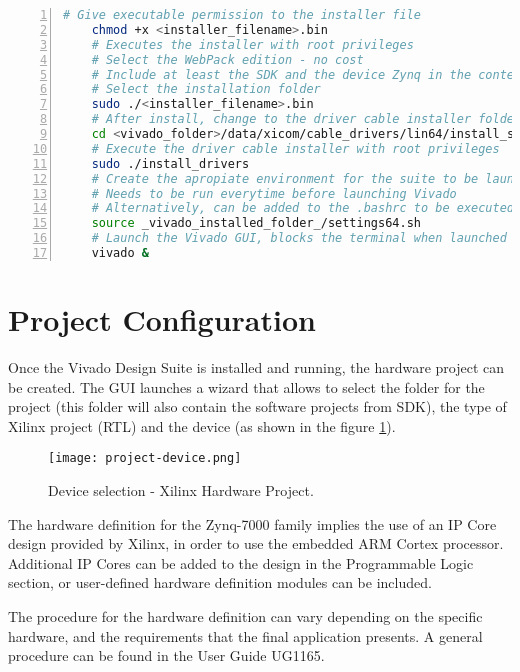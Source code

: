 \begin{lstlisting}[language=bash, basicstyle=\scriptsize\ttfamily, tabsize=2, commentstyle=\color{darkgray}, keywordstyle=\color{blue}, backgroundcolor=\color{lightgray}, morekeywords={chmod, sudo}, numbers=left, breaklines=true]
	# Give executable permission to the installer file
	chmod +x <installer_filename>.bin
	# Executes the installer with root privileges
	# Select the WebPack edition - no cost
	# Include at least the SDK and the device Zynq in the content selection
	# Select the installation folder
	sudo ./<installer_filename>.bin
	# After install, change to the driver cable installer folder
	cd <vivado_folder>/data/xicom/cable_drivers/lin64/install_script/install_drivers/
	# Execute the driver cable installer with root privileges
	sudo ./install_drivers
	# Create the apropiate environment for the suite to be launched
	# Needs to be run everytime before launching Vivado
	# Alternatively, can be added to the .bashrc to be executed automatically
	source _vivado_installed_folder_/settings64.sh
	# Launch the Vivado GUI, blocks the terminal when launched
	vivado &
\end{lstlisting}

\section{Project Configuration}

Once the Vivado Design Suite is installed and running, the hardware project can be created. The GUI launches a wizard that allows to select the folder for the project (this folder will also contain the software projects from SDK), the type of Xilinx project (RTL) and the device (as shown in the figure \ref{fig:device-vivado}).

\begin{figure}[h!]
	\centering
	\texttt{[image: project-device.png]}
	\caption{Device selection - Xilinx Hardware Project.}
	\label{fig:device-vivado}
\end{figure}

The hardware definition for the Zynq-7000 family implies the use of an IP Core design provided by Xilinx, in order to use the embedded ARM Cortex processor. Additional IP Cores can be added to the design in the Programmable Logic section, or user-defined hardware definition modules can be included.

The procedure for the hardware definition can vary depending on the specific hardware, and the requirements that the final application presents. A general procedure can be found in the User Guide UG1165\cite{UG1165}.

